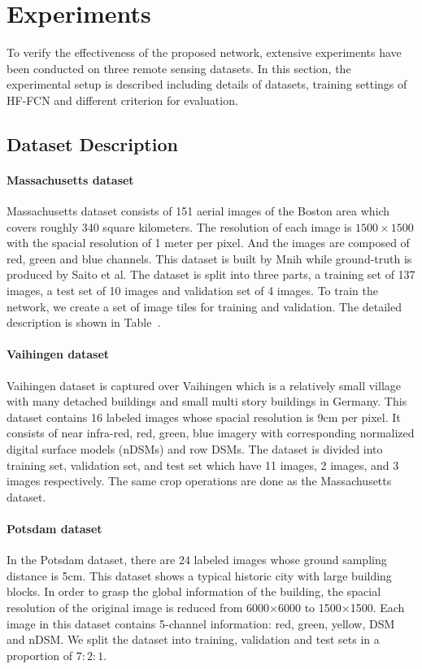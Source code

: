 \section{Experiments}
\label{Sec:exp}

To verify the effectiveness of the proposed network, extensive experiments have been conducted on three remote sensing datasets. In this section, the experimental setup is described including details of datasets, training settings of HF-FCN and different criterion for evaluation.


\subsection{Dataset Description}

\paragraph{Massachusetts dataset}
%
Massachusetts dataset consists of 151 aerial images of the Boston area which covers roughly 340 square kilometers.
The resolution of each image is $1500\times 1500$ with the spacial resolution of 1 meter per pixel. And the images are composed of red, green and blue channels.
This dataset is built by Mnih while ground-truth is produced by Saito et al.
The dataset is split into three parts,  a training set of 137 images, a test set of 10 images and validation set of 4 images.
To train the network, we create a set of image tiles for training and validation. The detailed description is shown in Table~\cite{table:dataset-composition}.

\paragraph{Vaihingen dataset}
%
Vaihingen dataset is captured over Vaihingen which is a relatively small village with many detached buildings and small multi story buildings in Germany.
This dataset contains 16 labeled images whose spacial resolution is 9cm per pixel.
It consists of near infra-red, red, green, blue imagery with corresponding normalized digital surface models (nDSMs) and row DSMs. The dataset is divided into training set, validation set, and test set which have 11 images, 2 images, and 3 images respectively. The same crop operations are done as the Massachusetts dataset.

\paragraph{Potsdam dataset}
%
In the Potsdam dataset, there are 24 labeled images whose ground sampling distance is 5cm.
This dataset shows a typical historic city with large building blocks. In order to grasp the global information of the building, the spacial resolution of the original image is reduced from 6000$\times$6000 to 1500$\times$1500.
Each image in this dataset contains 5-channel information: red, green, yellow, DSM and nDSM.
We split the dataset into training, validation and test sets in a proportion of $7:2:1$.



